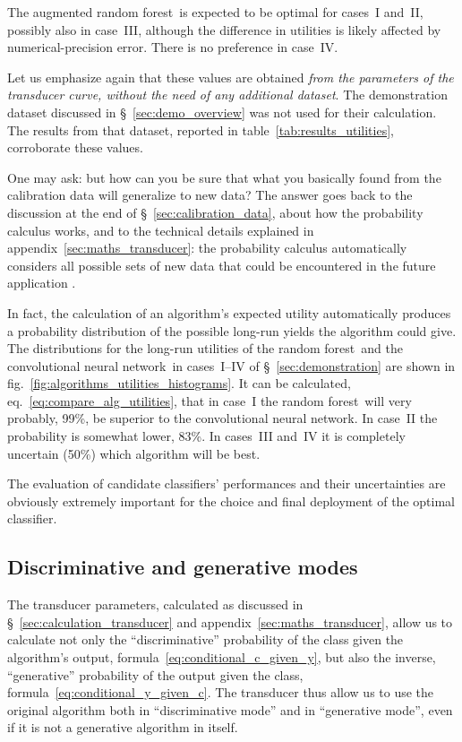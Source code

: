 \documentclass[\ifafour a4paper,12pt,\else a5paper,10pt,\fi%
onecolumn,oneside,article,%
british%
]{memoir}
\theoremstyle{remark}
\theoremstyle{innote}
\renewcommand*{\|}[1][]{\nonscript\:#1\vert\nonscript\:\mathopen{}}
\newcommand*{\sect}{\S}%
\newcommand*{\eqn}{eq.}%
\newcommand*{\fig}{fig.}%
\newcommand*{\cf}{{cf.}}
\newcommand*{\RF}{random forest}
\newcommand*{\CNN}{convolutional neural network}
\begin{document}
%
The augmented \RF\ is expected to be optimal for cases~I and~II, possibly also in case~III, although the difference in utilities is likely affected by numerical-precision error. There is no preference in case~IV.

Let us emphasize again that these values are obtained \emph{from the parameters of the transducer curve, without the need of any additional dataset}. The demonstration dataset discussed in \sect~\ref{sec:demo_overview} was not used for their calculation. The results from that dataset, reported in table~\ref{tab:results_utilities}, corroborate these values.


One may ask: but how can you be sure that what you basically found from the calibration data will generalize to new data? The answer goes back to the discussion at the end of \sect~\ref{sec:calibration_data}, about how the probability calculus works, and to the technical details explained in appendix~\ref{sec:maths_transducer}: the probability calculus automatically considers all possible sets of new data that could be encountered in the future application \autocites[\cf][]{smithetal2006}.

In fact, the calculation of an algorithm's expected utility automatically produces a probability distribution of the possible long-run yields the algorithm could give. The distributions for the long-run utilities of the \RF\ and the \CNN\ in cases~I--IV of \sect~\ref{sec:demonstration} are shown in \fig~\ref{fig:algorithms_utilities_histograms}. It can be calculated, \eqn~\eqref{eq:compare_alg_utilities}, that in case~I the \RF\ will very probably, 99\%, be superior to the \CNN. In case~II the probability is somewhat lower, 83\%. In cases~III and~IV it is completely uncertain (50\%) which algorithm will be best.

The evaluation of candidate classifiers' performances and their uncertainties are obviously extremely important for the choice and final deployment of the optimal classifier.

\subsection{Discriminative and generative modes}
\label{sec:effect_transd}

The transducer parameters, calculated as discussed in \sect~\ref{sec:calculation_transducer} and appendix~\ref{sec:maths_transducer}, allow us to calculate not only the \enquote{discriminative} probability of the class given the algorithm's output, formula~\eqref{eq:conditional_c_given_y}, but also the inverse, \enquote{generative} probability \autocites[\sect~21.2.3]{russelletal1995_r2022}[\sect~8.6]{murphy2012} of the output given the class, formula~\eqref{eq:conditional_y_given_c}. The transducer thus allow us to use the original algorithm both in \enquote{discriminative mode} and in \enquote{generative mode}, even if it is not a generative algorithm in itself.
\end{document}
